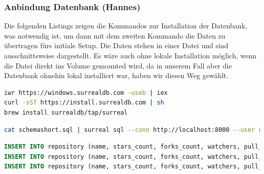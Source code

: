 \documentclass[notitlepage, hidelinks]{article}
\begin{document}
\subsubsection{Anbindung Datenbank (Hannes)} \label{anbindungdatenbank}
Die folgenden Listings zeigen die Kommandos zur Installation der Datenbank, was notwendig ist, um dann mit dem zweiten Kommando die Daten zu übertragen fürs initiale Setup. Die Daten stehen in einer Datei und sind ausschnittsweise dargestellt. Es wäre auch ohne lokale Installation möglich, wenn die Datei direkt ins Volume gemounted wird, da in unserem Fall aber die Datenbank ohnehin lokal installiert war, haben wir diesen Weg gewählt.

\begin{lstlisting}[language=bash,frame=single,caption=CLI Kommandos zur lokalen Installation der Datenbank für Windows\, Linux und macOS,label=dbinstall]
iwr https://windows.surrealdb.com -useb | iex
curl -sSf https://install.surrealdb.com | sh
brew install surrealdb/tap/surreal
\end{lstlisting}

\begin{lstlisting}[language=bash,frame=single,caption=CLI Kommando zur Übertragung der Daten aus der Datei in Listing \ref{sqldbone},label=dbsetup]
cat schemashort.sql | surreal sql --conn http://localhost:8000 --user root --pass root --ns base --db base
\end{lstlisting}


\begin{lstlisting}[language=SQL,frame=single,caption=Ausschnitt der sql Setupdatei,label=sqldbone]
INSERT INTO repository (name, stars_count, forks_count, watchers, pull_requests, primary_language, languages_used, commit_count, created_at, licence) VALUES ('react', 159266, 30464, 8497, 2911, lang:JavaScript, [lang:JavaScript, lang:HTML, lang:CSS], 5562, '2013-05-24T16:15:54Z', 'MIT License');
INSERT INTO repository (name, stars_count, forks_count, watchers, pull_requests, primary_language, languages_used, commit_count, created_at, licence) VALUES ('scikit-learn', 38327, 18225, 4968, 1701, lang:Python, [lang:Python, lang:Cython, lang:HTML, lang:CSS], 4085, '2010-01-10T09:58:52Z', 'BSD-3-Clause License');
INSERT INTO repository (name, stars_count, forks_count, watchers, pull_requests, primary_language, languages_used, commit_count, created_at, licence) VALUES ('angular', 68521, 24536, 6779, 2197, lang:TypeScript, [lang:TypeScript, lang:JavaScript, lang:HTML, lang:CSS], 4248, '2014-09-18T16:12:01Z', 'MIT License');
\end{lstlisting}
\end{document}
